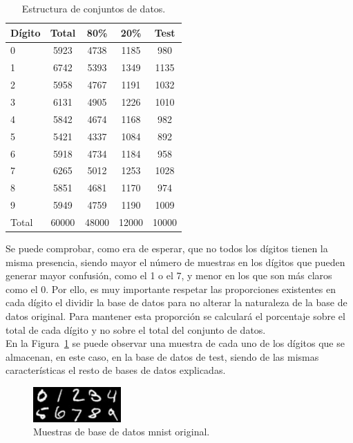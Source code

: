 \begin{table}[H]
	\centering
	\begin{tabular}{|l|c|c|c|c|}
		\hline
		\textbf{Dígito} & \textbf{Total} & \textbf{80\%} & \textbf{20\%} & \textbf{Test}\\
		\hline \hline
		0 & 5923 & 4738 & 1185 & 980\\ \hline
		1 & 6742 & 5393 & 1349 & 1135\\ \hline
		2 & 5958 & 4767 & 1191 & 1032\\ \hline
		3 & 6131 & 4905 & 1226 & 1010\\ \hline
		4 & 5842 & 4674 & 1168 & 982\\ \hline
		5 & 5421 & 4337 & 1084 & 892\\ \hline
		6 & 5918 & 4734 & 1184 & 958\\ \hline
		7 & 6265 & 5012 & 1253 & 1028\\ \hline
		8 & 5851 & 4681 & 1170 & 974\\ \hline
		9 & 5949 & 4759 & 1190 & 1009\\ \hline
		Total & 60000 & 48000 & 12000 & 10000\\ \hline
	\end{tabular}
	\caption{Estructura de conjuntos de datos.}
	\label{tab.baseDatos}
\end{table}

Se puede comprobar, como era de esperar, que no todos los dígitos tienen la misma presencia, siendo mayor el número de muestras en los dígitos que pueden generar mayor confusión, como el 1 o el 7, y menor en los que son más claros como el 0. Por ello, es muy importante respetar las proporciones existentes en cada dígito el dividir la base de datos para no alterar la naturaleza de la base de datos original. Para mantener esta proporción se calculará el porcentaje sobre el total de cada dígito y no sobre el total del conjunto de datos.\\

En la Figura~\ref{fig.digitosMNIST} se puede observar una muestra de cada uno de los dígitos que se almacenan, en este caso, en la base de datos de test, siendo de las mismas características el resto de bases de datos explicadas.

\begin{figure}[H]
	\begin{center}
		\includegraphics[width=0.3\textwidth]{figures/original}
		\caption{Muestras de base de datos \acrshort{mnist} original.}
		\label{fig.digitosMNIST}
	\end{center}
\end{figure}


